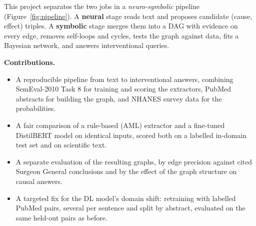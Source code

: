 \documentclass[11pt,a4paper]{article}
\begin{document}
This project separates the two jobs in a \emph{neuro-symbolic} pipeline (Figure~\ref{fig:pipeline}). A \textbf{neural} stage reads text
and proposes candidate (cause, effect) triples. A \textbf{symbolic} stage merges them into a DAG with evidence on every edge, removes
self-loops and cycles, tests the graph against data, fits a Bayesian network, and answers interventional queries.

\textbf{Contributions.}
\begin{itemize}
  \item A reproducible pipeline from text to interventional answers, combining SemEval-2010 Task 8 for training and scoring the
        extractors, PubMed abstracts for building the graph, and NHANES survey data for the probabilities.
  \item A fair comparison of a rule-based (AML) extractor and a fine-tuned DistilBERT model on identical inputs, scored both on a
        labelled in-domain test set and on scientific text.
  \item A separate evaluation of the resulting graphs, by edge precision against cited Surgeon General conclusions and by the effect of the
        graph structure on causal answers.
  \item A targeted fix for the DL model's domain shift: retraining with labelled PubMed pairs, several per sentence and split by
        abstract, evaluated on the same held-out pairs as before.
\end{itemize}
\end{document}
